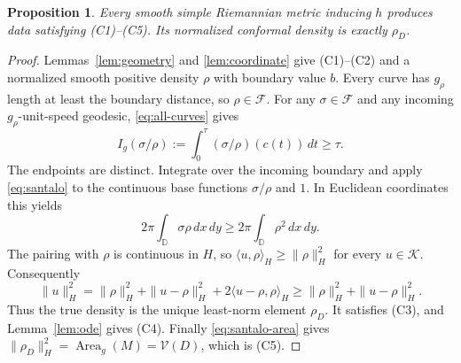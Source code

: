 \documentclass[11pt]{article}
\newtheorem{proposition}[theorem]{Proposition}
\theoremstyle{remark}
\newcommand{\D}{\mathbb D}
\newcommand{\Fset}{\mathcal F}
\newcommand{\Kset}{\mathcal K}
\newcommand{\Varea}{\mathcal V}
\newcommand{\dd}{\,d}
\DeclareMathOperator{\Area}{Area}
\begin{document}
\begin{proposition}\label{prop:necessity}
Every smooth simple Riemannian metric inducing $h$ produces data
satisfying (C1)--(C5). Its normalized conformal density is exactly
$\rho_D$.
\end{proposition}
\begin{proof}
Lemmas~\ref{lem:geometry} and \ref{lem:coordinate} give (C1)--(C2)
and a normalized smooth positive density $\rho$ with boundary value $b$.
Every curve has $g_\rho$ length at least the boundary distance, so
$\rho\in\Fset$. For any $\sigma\in\Fset$ and any incoming
$g_\rho$-unit-speed geodesic, \eqref{eq:all-curves} gives
\[
 I_g(\sigma/\rho):=\int_0^\tau(\sigma/\rho)(c(t))\dd t\ge\tau.
\]
The endpoints are distinct. Integrate over the incoming boundary and
apply \eqref{eq:santalo} to the continuous base functions $\sigma/\rho$
and $1$. In Euclidean coordinates this yields
\[
 2\pi\int_\D\sigma\rho\dd x\dd y
        \ge 2\pi\int_\D\rho^2\dd x\dd y.
\]
The pairing with $\rho$ is continuous in $H$, so
$\langle u,\rho\rangle_H\ge\|\rho\|_H^2$ for every $u\in\Kset$.
Consequently
\[
 \|u\|_H^2
 =\|\rho\|_H^2+\|u-\rho\|_H^2+2\langle u-\rho,\rho\rangle_H
 \ge\|\rho\|_H^2+\|u-\rho\|_H^2.
\]
Thus the true density is the unique least-norm element $\rho_D$.
It satisfies (C3), and Lemma~\ref{lem:ode} gives (C4).
Finally \eqref{eq:santalo-area} gives
$\|\rho_D\|_H^2=\Area_g(M)=\Varea(D)$, which is (C5).
\end{proof}
\end{document}
